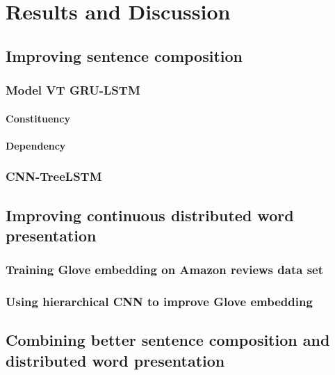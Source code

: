 \chapter{Results and Discussion}


\section{Improving sentence composition}

\subsection{Model VT GRU-LSTM}

\subsubsection{Constituency}

\subsubsection{Dependency}


\subsection{CNN-TreeLSTM}


\section{Improving continuous distributed word presentation}

\subsection{Training Glove embedding on Amazon reviews data set}

\subsection{Using hierarchical CNN to improve Glove embedding}


\section{Combining better sentence composition and distributed word presentation}

